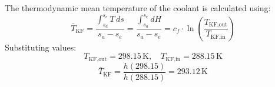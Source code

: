 The thermodynamic mean temperature of the coolant is calculated using:  
\[
\bar{T}_{\text{KF}} = \frac{\int_{s_a}^{s_e} T \, ds}{s_a - s_e} = \frac{\int_{s_a}^{s_e} dH}{s_a - s_e} = c_f \cdot \ln\left(\frac{T_{\text{KF,out}}}{T_{\text{KF,in}}}\right)
\]  
Substituting values:  
\[
T_{\text{KF,out}} = 298.15 \, \text{K}, \quad T_{\text{KF,in}} = 288.15 \, \text{K}
\]  
\[
\bar{T}_{\text{KF}} = \frac{h(298.15)}{h(288.15)} = 293.12 \, \text{K}
\]